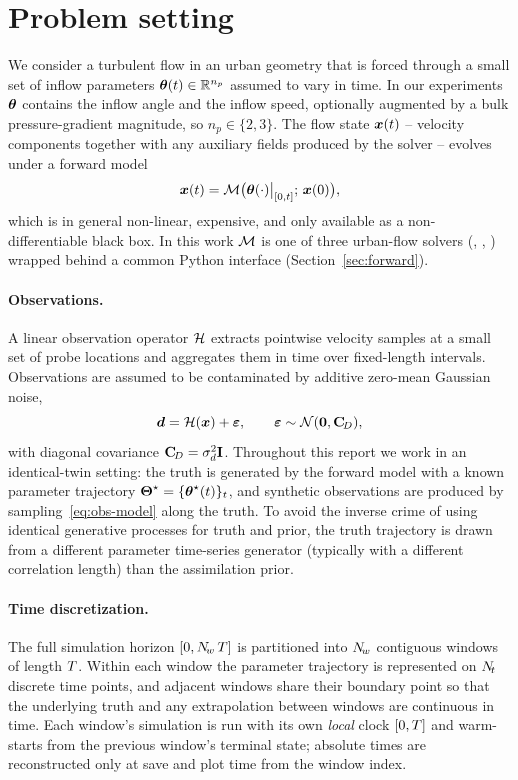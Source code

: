 \section{Problem setting}
\label{sec:problem}

We consider a turbulent flow in an urban geometry that is forced
through a small set of inflow parameters
$\boldsymbol{\theta}(t) \in \mathbb{R}^{n_p}$ assumed to vary in time.  In our experiments
$\boldsymbol{\theta}$ contains the inflow angle and the inflow speed, optionally
augmented by a bulk pressure-gradient magnitude, so $n_p \in \{2,
3\}$.  The flow state $\boldsymbol{x}(t)$ -- velocity components together
with any auxiliary fields produced by the solver -- evolves under a
forward model
\begin{equation}
  \boldsymbol{x}(t) = \mathcal{M}\bigl(\boldsymbol{\theta}(\cdot)\big|_{[0,t]};\, \boldsymbol{x}(0)\bigr),
  \label{eq:forward-abstract}
\end{equation}
which is in general non-linear, expensive, and only available as a
non-differentiable black box.  In this work $\mathcal{M}$ is one of three
urban-flow solvers (\pylbm{}, \pyudales{}, \pypalm{}) wrapped behind
a common Python interface (Section~\ref{sec:forward}).

\paragraph{Observations.}
A linear observation operator $\mathcal{H}$ extracts pointwise velocity
samples at a small set of probe locations and aggregates them in
time over fixed-length intervals.  Observations are assumed to be
contaminated by additive zero-mean Gaussian noise,
\begin{equation}
  \boldsymbol{d} = \mathcal{H}(\boldsymbol{x}) + \boldsymbol{\varepsilon}, \qquad \boldsymbol{\varepsilon} \sim \mathcal{N}(\mathbf{0}, \mathbf{C}_{\!D}),
  \label{eq:obs-model}
\end{equation}
with diagonal covariance $\mathbf{C}_{\!D} = \sigma_d^2 \mathbf{I}$.  Throughout
this report we work in an identical-twin
setting: the truth is generated by the forward model with a known
parameter trajectory $\boldsymbol{\Theta}^\star = \{\boldsymbol{\theta}^\star(t)\}_t$, and
synthetic observations are produced by sampling~\eqref{eq:obs-model}
along the truth.  To avoid the inverse crime of using identical
generative processes for truth and prior, the truth trajectory is
drawn from a different parameter time-series generator (typically
with a different correlation length) than the assimilation prior.

\paragraph{Time discretization.}
The full simulation horizon $[0, N_{\!w}\, T]$ is partitioned
into $N_{\!w}$ contiguous windows of length $T$.  Within each
window the parameter trajectory is represented on $N_{\!t}$ discrete
time points, and adjacent windows share their boundary point so that
the underlying truth and any extrapolation between windows are
continuous in time.  Each window's simulation is run with its own
\emph{local} clock $[0, T]$ and warm-starts from the
previous window's terminal state; absolute times are reconstructed
only at save and plot time from the window index.

